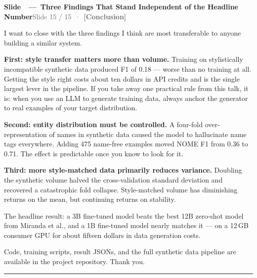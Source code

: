 \documentclass[11pt,a4paper]{article}
\newcommand{\phaselabel}[2]{\textbf{\textcolor{#1}{[#2]}}}
\newcounter{slidectr}
\newcommand{\slidescript}[3]{%
  \stepcounter{slidectr}
  \begin{slidebox}
    \noindent\textbf{Slide \theslidectr\ \,—\, #1}\hfill\small\textcolor{dimgray}{#2}
  \end{slidebox}
  \vspace{0.4em}
  #3
  \vspace{1.2em}
  \noindent\textcolor{dimgray!60}{\rule{\linewidth}{0.4pt}}
  \vspace{0.6em}
}
\begin{document}
\slidescript{Three Findings That Stand Independent of the Headline Number}{Slide 15 / 15 \,·\, \phaselabel{results}{Conclusion}}{

I want to close with the three findings I think are most transferable to anyone building a similar system.

\textbf{First: style transfer matters more than volume.} Training on stylistically incompatible synthetic data produced F1 of 0.18 — worse than no training at all. Getting the style right costs about ten dollars in API credits and is the single largest lever in the pipeline. If you take away one practical rule from this talk, it is: when you use an LLM to generate training data, always anchor the generator to real examples of your target distribution.

\textbf{Second: entity distribution must be controlled.} A four-fold over-representation of names in synthetic data caused the model to hallucinate name tags everywhere. Adding 475 name-free examples moved NOME F1 from 0.36 to 0.71. The effect is predictable once you know to look for it.

\textbf{Third: more style-matched data primarily reduces variance.} Doubling the synthetic volume halved the cross-validation standard deviation and recovered a catastrophic fold collapse. Style-matched volume has diminishing returns on the mean, but continuing returns on stability.

The headline result: a 3B fine-tuned model beats the best 12B zero-shot model from Miranda et al., and a 1B fine-tuned model nearly matches it — on a 12\,GB consumer GPU for about fifteen dollars in data generation costs.

Code, training scripts, result JSONs, and the full synthetic data pipeline are available in the project repository. Thank you.

}
\end{document}
